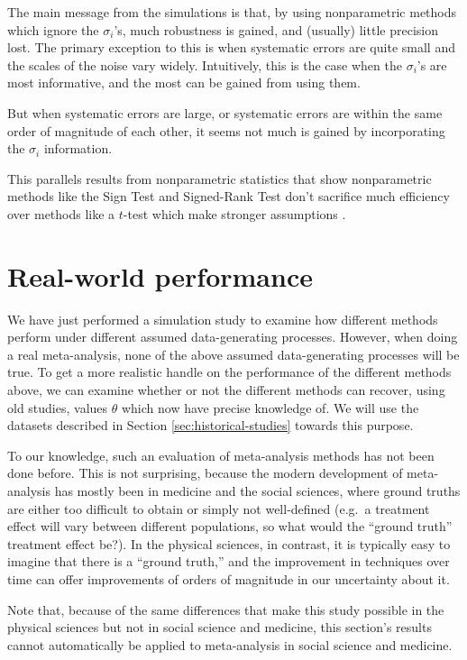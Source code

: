 \documentclass[letterpaper,12pt]{article}
\begin{document}
The main message from the simulations is that, by using nonparametric methods which ignore the $\sigma_i$'s, much robustness is gained, and (usually) little precision lost. The primary exception to this is when systematic errors are quite small and the scales of the noise vary widely. Intuitively, this is the case when the $\sigma_i$'s are most informative, and the most can be gained from using them.

But when systematic errors are large, or systematic errors are within the same order of magnitude of each other, it seems not much is gained by incorporating the $\sigma_i$ information.

This parallels results from nonparametric statistics that show nonparametric methods like the Sign Test and Signed-Rank Test don't sacrifice much efficiency over methods like a $t$-test which make stronger assumptions \citep{conover1999practical}.

\section{Real-world performance}\label{sec:realworld}

We have just performed a simulation study to examine how different methods perform under different assumed data-generating processes. However, when doing a real meta-analysis, none of the above assumed data-generating processes will be true. To get a more realistic handle on the performance of the different methods above, we can examine whether or not the different methods can recover, using old studies, values $\theta$ which now have precise knowledge of. We will use the datasets described in Section \ref{sec:historical-studies} towards this purpose.

To our knowledge, such an evaluation of meta-analysis methods has not been done before. This is not surprising, because the modern development of meta-analysis has mostly been in medicine and the social sciences, where ground truths are either too difficult to obtain or simply not well-defined (e.g.~a treatment effect will vary between different populations, so what would the ``ground truth'' treatment effect be?). In the physical sciences, in contrast, it is typically easy to imagine that there is a ``ground truth,'' and the improvement in techniques over time can offer improvements of orders of magnitude in our uncertainty about it.

Note that, because of the same differences that make this study possible in the physical sciences but not in social science and medicine, this section's results cannot automatically be applied to meta-analysis in social science and medicine.
\end{document}
